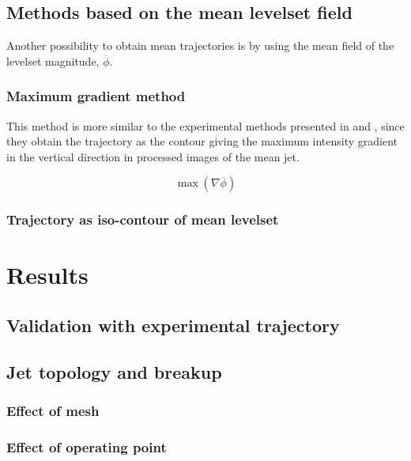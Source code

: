 \subsection{Methods based on the mean levelset field}

Another possibility to obtain mean trajectories is by using the mean field of the levelset magnitude, $\overline{\phi}$. 

\subsubsection*{Maximum gradient method}

This method is more similar to the experimental methods presented in  and , since they obtain the trajectory as the contour giving the maximum intensity gradient in the vertical direction in processed images of the mean jet.

\begin{equation}
\max \left( \nabla \overline{\phi} \right)
\end{equation}

\subsubsection*{Trajectory as iso-contour of mean levelset}





\section{Results}
\label{sec:results_JICF_resolved}

\subsection{Validation with experimental trajectory}

\subsection{Jet topology and breakup}

\subsubsection{Effect of mesh}

\subsubsection{Effect of operating point}

